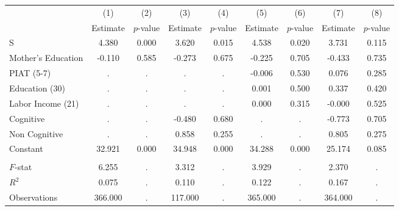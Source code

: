 \begin{tabular}{lcccccccc} \toprule
 & (1) & (2) & (3) & (4) & (5) & (6) & (7) & (8) \\ 
 & Estimate  & $p$-value  & Estimate  & $p$-value  & Estimate  & $p$-value  & Estimate  & $p$-value  \\  \midrule
S &     4.380 &     0.000 &     3.620 &     0.015 &     4.538 &     0.020 &     3.731 &     0.115 \\  
Mother's Education &    -0.110 &     0.585 &    -0.273 &     0.675 &    -0.225 &     0.705 &    -0.433 &     0.735 \\  
PIAT (5-7) &         . &         . &         . &         . &    -0.006 &     0.530 &     0.076 &     0.285 \\  
Education (30) &         . &         . &         . &         . &     0.001 &     0.500 &     0.337 &     0.420 \\  
Labor Income (21) &         . &         . &         . &         . &     0.000 &     0.315 &    -0.000 &     0.525 \\  
Cognitive &         . &         . &    -0.480 &     0.680 &         . &         . &    -0.773 &     0.705 \\  
Non Cognitive &         . &         . &     0.858 &     0.255 &         . &         . &     0.805 &     0.275 \\  
Constant &    32.921 &     0.000 &    34.948 &     0.000 &    34.288 &     0.000 &    25.174 &     0.085 \\  \\ \midrule
$F$-stat &     6.255 &         . &     3.312 &         . &     3.929 &         . &     2.370 &         . \\  
$R^2$ &     0.075 &         . &     0.110 &         . &     0.122 &         . &     0.167 &         . \\  
Observations &   366.000 &         . &   117.000 &         . &   365.000 &         . &   364.000 &         . \\  
\bottomrule \end{tabular}
